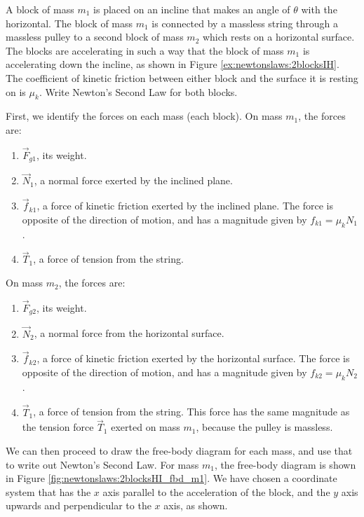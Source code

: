\begin{example}{A block of mass $m_1$ is placed on an incline that makes an angle of $\theta$ with the horizontal. The block of mass $m_1$ is connected by a massless string through a massless pulley to a second block of mass $m_2$ which rests on a horizontal surface. The blocks are accelerating in such a way that the block of mass $m_1$ is accelerating down the incline, as shown in Figure \ref{ex:newtonslaws:2blocksIH}. The coefficient of kinetic friction between either block and the surface it is resting on is $\mu_k$. Write Newton's Second Law for both blocks.}
\label{ex:newtonslaws:2blocksHI}

First, we identify the forces on each mass (each block). On mass $m_1$, the forces are:

\begin{enumerate}
\item $\vec F_{g1}$, its weight.
\item $\vec N_1$, a normal force exerted by the inclined plane.
\item $\vec f_{k1}$, a force of kinetic friction exerted by the inclined plane. The force is opposite of the direction of motion, and has a magnitude given by $f_{k1}=\mu_kN_1$.
\item $\vec T_1$, a force of tension from the string. 
\end{enumerate}

On mass $m_2$, the forces are:

\begin{enumerate}
\item $\vec F_{g2}$, its weight.
\item $\vec N_2$, a normal force from the horizontal surface.
\item $\vec f_{k2}$, a force of kinetic friction exerted by the horizontal surface. The force is opposite of the direction of motion, and has a magnitude given by $f_{k2}=\mu_kN_2$.
\item $\vec T_1$, a force of tension from the string. This force has the same magnitude as the tension force $\vec T_1$ exerted on mass $m_1$, because the pulley is massless. 
\end{enumerate}

We can then proceed to draw the free-body diagram for each mass, and use that to write out Newton's Second Law. For mass $m_1$, the free-body diagram is shown in Figure \ref{fig:newtonslaws:2blocksHI_fbd_m1}. We have chosen a coordinate system that has the $x$ axis parallel to the acceleration of the block, and the $y$ axis upwards and perpendicular to the $x$ axis, as shown. 


\end{example}
